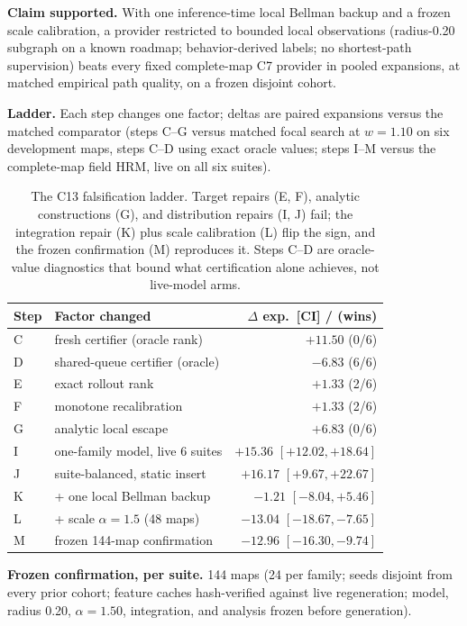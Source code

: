 \documentclass[letterpaper]{article} %
\newcommand{\stage}[1]{\textsc{#1}}
\begin{document}
\textbf{Claim supported.} With one inference-time local Bellman backup and a frozen scale calibration, a provider restricted to bounded local observations (radius-0.20 subgraph on a known roadmap; behavior-derived labels; no shortest-path supervision) beats every fixed complete-map \stage{C7} provider in pooled expansions, at matched empirical path quality, on a frozen disjoint cohort.

\textbf{Ladder.} Each step changes one factor; deltas are paired expansions versus the matched comparator (steps C--G versus matched focal search at $w{=}1.10$ on six development maps, steps C--D using exact oracle values; steps I--M versus the complete-map field HRM, live on all six suites).

\begin{table}[t]
\centering
\small
\setlength{\tabcolsep}{1.5pt}
\begin{tabular}{@{}llr@{}}
\toprule
Step & Factor changed & $\Delta$ exp.\ [CI] / (wins) \\
\midrule
C & fresh certifier (oracle rank) & $+11.50$ (0/6) \\
D & shared-queue certifier (oracle) & $-6.83$ (6/6) \\
E & exact rollout rank & $+1.33$ (2/6) \\
F & monotone recalibration & $+1.33$ (2/6) \\
G & analytic local escape & $+6.83$ (0/6) \\
I & one-family model, live 6 suites & $+15.36$ $[+12.02,+18.64]$ \\
J & suite-balanced, static insert & $+16.17$ $[+9.67,+22.67]$ \\
K & + one local Bellman backup & $-1.21$ $[-8.04,+5.46]$ \\
L & + scale $\alpha{=}1.5$ (48 maps) & $-13.04$ $[-18.67,-7.65]$ \\
M & frozen 144-map confirmation & $-12.96$ $[-16.30,-9.74]$ \\
\bottomrule
\end{tabular}
\caption{The \stage{C13} falsification ladder. Target repairs (E, F), analytic constructions (G), and distribution repairs (I, J) fail; the integration repair (K) plus scale calibration (L) flip the sign, and the frozen confirmation (M) reproduces it. Steps C--D are oracle-value diagnostics that bound what certification alone achieves, not live-model arms.}
\label{tab:c13ladder}
\end{table}

\textbf{Frozen confirmation, per suite.} 144 maps (24 per family; seeds disjoint from every prior cohort; feature caches hash-verified against live regeneration; model, radius 0.20, $\alpha{=}1.50$, integration, and analysis frozen before generation).
\end{document}
